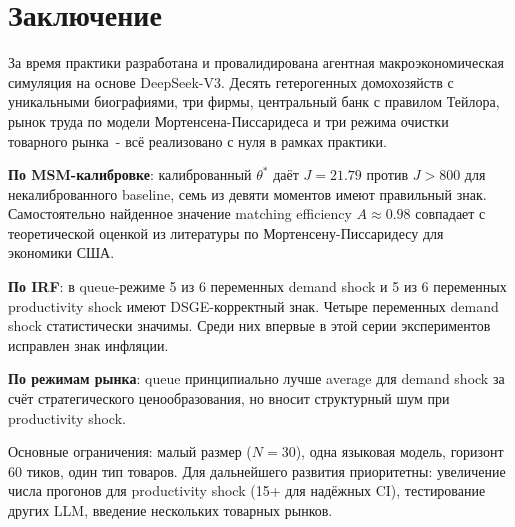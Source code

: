 \documentclass[12pt, a4paper]{article}
\begin{document}
\section{Заключение}

За время практики разработана и провалидирована агентная макроэкономическая симуляция на основе DeepSeek-V3. Десять гетерогенных домохозяйств с уникальными биографиями, три фирмы, центральный банк с правилом Тейлора, рынок труда по модели Мортенсена-Писсаридеса и три режима очистки товарного рынка~- всё реализовано с нуля в рамках практики.

\textbf{По MSM-калибровке}: калиброванный $\theta^*$ даёт $J = 21.79$ против $J > 800$ для некалиброванного baseline, семь из девяти моментов имеют правильный знак. Самостоятельно найденное значение matching efficiency $A \approx 0.98$ совпадает с теоретической оценкой из литературы по Мортенсену-Писсаридесу для экономики США.

\textbf{По IRF}: в queue-режиме 5 из 6 переменных demand shock и 5 из 6 переменных productivity shock имеют DSGE-корректный знак. Четыре переменных demand shock статистически значимы. Среди них впервые в этой серии экспериментов исправлен знак инфляции.


\textbf{По режимам рынка}: queue принципиально лучше average для demand shock за счёт стратегического ценообразования, но вносит структурный шум при productivity shock.

Основные ограничения: малый размер ($N = 30$), одна языковая модель, горизонт 60 тиков, один тип товаров. Для дальнейшего развития приоритетны: увеличение числа прогонов для productivity shock (15+ для надёжных CI), тестирование других LLM, введение нескольких товарных рынков.

\clearpage

\end{document}
